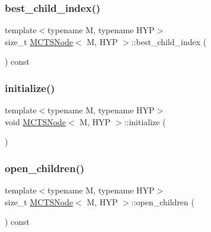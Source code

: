 \mbox{\label{class_m_c_t_s_node_a64290d7134b6841a49e84a244512bd19}} 
\subsubsection{\texorpdfstring{best\+\_\+child\+\_\+index()}{best\_child\_index()}}
{\footnotesize\ttfamily template$<$typename M, typename H\+YP$>$ \\
size\+\_\+t \hyperlink{class_m_c_t_s_node}{M\+C\+T\+S\+Node}$<$ M, H\+YP $>$\+::best\+\_\+child\+\_\+index (\begin{DoxyParamCaption}{ }\end{DoxyParamCaption}) const\hspace{0.3cm}{\ttfamily [inline]}}

\mbox{\label{class_m_c_t_s_node_aadbe8d42f6761eb3e4f28fb9157a873d}} 
\subsubsection{\texorpdfstring{initialize()}{initialize()}}
{\footnotesize\ttfamily template$<$typename M, typename H\+YP$>$ \\
void \hyperlink{class_m_c_t_s_node}{M\+C\+T\+S\+Node}$<$ M, H\+YP $>$\+::initialize (\begin{DoxyParamCaption}{ }\end{DoxyParamCaption})\hspace{0.3cm}{\ttfamily [inline]}}

\mbox{\label{class_m_c_t_s_node_a40ca22fadfb24bed0ccbd15d3958c674}} 
\subsubsection{\texorpdfstring{open\+\_\+children()}{open\_children()}}
{\footnotesize\ttfamily template$<$typename M, typename H\+YP$>$ \\
size\+\_\+t \hyperlink{class_m_c_t_s_node}{M\+C\+T\+S\+Node}$<$ M, H\+YP $>$\+::open\+\_\+children (\begin{DoxyParamCaption}{ }\end{DoxyParamCaption}) const\hspace{0.3cm}{\ttfamily [inline]}}


